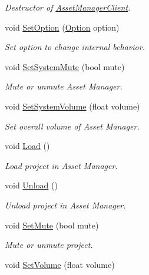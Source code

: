 \begin{DoxyCompactItemize}
\begin{DoxyCompactList}\small\item\em Destructor of {\itshape \hyperlink{classam_1_1_asset_manager_client}{AssetManagerClient}\/}. \end{DoxyCompactList}\item 
void \hyperlink{classam_1_1_asset_manager_client_a9b305a3d9362bdacbf0b676df39474c5}{SetOption} (\hyperlink{classam_1_1_asset_manager_client_a46c830784e6b2983faa4764d1cad8204}{Option} option)
\begin{DoxyCompactList}\small\item\em Set option to change internal behavior. \end{DoxyCompactList}\item 
void \hyperlink{classam_1_1_asset_manager_client_a42894c6bff07e22fb9598e1c089779a6}{SetSystemMute} (bool mute)
\begin{DoxyCompactList}\small\item\em Mute or unmute Asset Manager. \end{DoxyCompactList}\item 
void \hyperlink{classam_1_1_asset_manager_client_a22b644bd78df97d01a08ef4d36bd60bc}{SetSystemVolume} (float volume)
\begin{DoxyCompactList}\small\item\em Set overall volume of Asset Manager. \end{DoxyCompactList}\item 
void \hyperlink{classam_1_1_asset_manager_client_a185b1f7d9a2953b05699dcc9cdfc8a6c}{Load} ()
\begin{DoxyCompactList}\small\item\em Load project in Asset Manager. \end{DoxyCompactList}\item 
void \hyperlink{classam_1_1_asset_manager_client_ac738859d526f37cc1a708d5d4f8f2de3}{Unload} ()
\begin{DoxyCompactList}\small\item\em Unload project in Asset Manager. \end{DoxyCompactList}\item 
void \hyperlink{classam_1_1_asset_manager_client_aaf7ae48f7234fcc98f9c5e15dad4c46c}{SetMute} (bool mute)
\begin{DoxyCompactList}\small\item\em Mute or unmute project. \end{DoxyCompactList}\item 
void \hyperlink{classam_1_1_asset_manager_client_a0aacdcf0ab177994980ea5a28d368292}{SetVolume} (float volume)

\end{DoxyCompactItemize}

